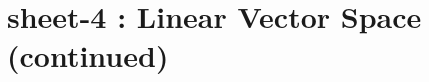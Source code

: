 \chapter{sheet-4 : Linear Vector Space (continued)}

\ifpdf
\graphicspath{{Chapter4/figs/}}
\else
\graphicspath{{Chapter4/figs/}}
\fi








%
%
